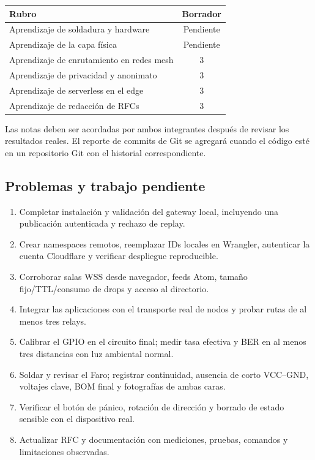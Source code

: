 \documentclass[12pt,a4paper]{article}
\begin{document}
\begin{center}
\begin{tabular}{p{}c}
\toprule
\textbf{Rubro} & \textbf{Borrador}\\
\midrule
Aprendizaje de soldadura y hardware & Pendiente\\
Aprendizaje de la capa física & Pendiente\\
Aprendizaje de enrutamiento en redes mesh & 3\\
Aprendizaje de privacidad y anonimato & 3\\
Aprendizaje de serverless en el edge & 3\\
Aprendizaje de redacción de RFCs & 3\\
\bottomrule
\end{tabular}
\end{center}
Las notas deben ser acordadas por ambos integrantes después de revisar los
resultados reales. El reporte de commits de Git se agregará cuando el código
esté en un repositorio Git con el historial correspondiente.

\subsection{Problemas y trabajo pendiente}
\begin{enumerate}
  \item Completar instalación y validación del gateway local, incluyendo una publicación autenticada y rechazo de replay.
  \item Crear namespaces remotos, reemplazar IDs locales en Wrangler, autenticar la cuenta Cloudflare y verificar despliegue reproducible.
  \item Corroborar salas WSS desde navegador, feeds Atom, tamaño fijo/TTL/consumo de drops y acceso al directorio.
  \item Integrar las aplicaciones con el transporte real de nodos y probar rutas de al menos tres relays.
  \item Calibrar el GPIO en el circuito final; medir tasa efectiva y BER en al menos tres distancias con luz ambiental normal.
  \item Soldar y revisar el Faro; registrar continuidad, ausencia de corto VCC--GND, voltajes clave, BOM final y fotografías de ambas caras.
  \item Verificar el botón de pánico, rotación de dirección y borrado de estado sensible con el dispositivo real.
  \item Actualizar RFC y documentación con mediciones, pruebas, comandos y limitaciones observadas.
\end{enumerate}
\end{document}
